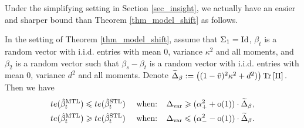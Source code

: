 Under the simplifying setting in Section \ref{sec_insight}, we actually have an easier and sharper bound than Theorem \ref{thm_model_shift} as follows. 
\begin{lemma}\label{prop_model_shift_tight}
		In the setting of Theorem \ref{thm_model_shift}, assume that $\Sigma_1 =\operatorname{Id}$,
		$\beta_t$ is a random vector with i.i.d. entries with mean $0$, variance $\kappa^2$ and all moments, and $\beta_2$ is a random vector such that $\beta_s - \beta_t$ is a random vector with i.i.d. entries with mean $0$, variance $d^2$ and all moments. Denote
		$\widetilde \Delta_{\beta} := \left({(1 - \hat{v})^2 \kappa^2 + d^2)}\right) \operatorname{Tr}\left[\Pi\right].$
	Then we have
		\begin{align*}
			te(\hat{\beta}_t^{\text{MTL}}) \leqslant te(\hat{\beta}_t^{\text{STL}})\quad \text{ when: }\ \  & \Delta_{\text{var}} \geqslant  (\alpha_+^2+\operatorname{o}(1))\cdot \widetilde \Delta_{\beta}, \\
			te(\hat{\beta}_t^{\text{MTL}}) \geqslant te(\hat{\beta}_t^{\text{STL}})\quad \text{ when: }\ \  & \Delta_{\text{var}} \leqslant (\alpha_-^2-\operatorname{o}(1))\cdot \widetilde\Delta_{\beta}.
		\end{align*}
\end{lemma}


